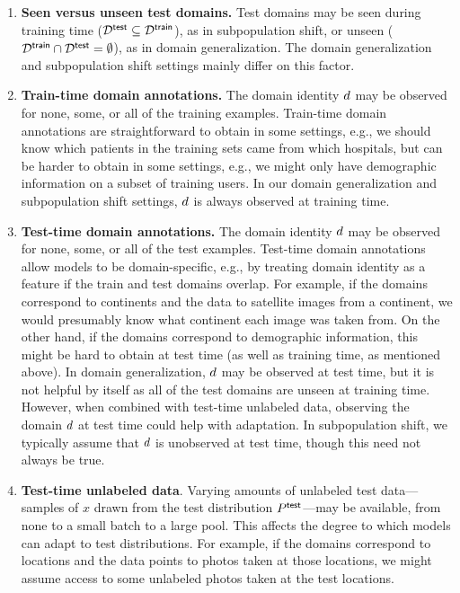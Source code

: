 \begin{enumerate}
  \item \textbf{Seen versus unseen test domains.}
    Test domains may be seen during training time ($\mathcal{D}^\mathsf{test}\subseteq\mathcal{D}^\mathsf{train}$), as in subpopulation shift, or unseen
    ($\mathcal{D}^\mathsf{train} \cap \mathcal{D}^\mathsf{test} = \emptyset$), as in domain generalization.
    The domain generalization and subpopulation shift settings mainly differ on this factor.
  \item \textbf{Train-time domain annotations.}
    The domain identity $d$ may be observed for none, some, or all of the training examples.
    Train-time domain annotations are straightforward to obtain in some settings, e.g., we should know which patients in the training sets came from which hospitals, but can be harder to obtain in some settings, e.g., we might only have demographic information on a subset of training users. In our domain generalization and subpopulation shift settings, $d$ is always observed at training time.
  \item \textbf{Test-time domain annotations.}
    The domain identity $d$ may be observed for none, some, or all of the test examples.
    Test-time domain annotations allow models to be domain-specific, e.g., by treating domain identity as a feature if the train and test domains overlap.
    For example, if the domains correspond to continents and the data to satellite images from a continent, we would presumably know what continent each image was taken from.
    On the other hand, if the domains correspond to demographic information, this might be hard to obtain at test time (as well as training time, as mentioned above).
    In domain generalization, $d$ may be observed at test time, but it is not helpful by itself as all of the test domains are unseen at training time. However, when combined with test-time unlabeled data, observing the domain $d$ at test time could help with adaptation.
    In subpopulation shift, we typically assume that $d$ is unobserved at test time, though this need not always be true.
  \item \textbf{Test-time unlabeled data}.
    Varying amounts of unlabeled test data---samples of $x$ drawn from the test distribution $P^\mathsf{test}$---may be available, from none to a small batch to a large pool. This affects the degree to which models can adapt to test distributions.
    For example, if the domains correspond to locations and the data points to photos taken at those locations, we might assume access to some unlabeled photos taken at the test locations.
\end{enumerate}

